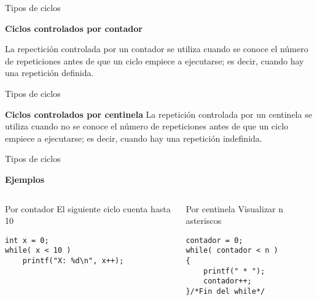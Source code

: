 \begin{frame}{Tipos de ciclos}
\begin{center}
    \textbf{Ciclos controlados por contador}
\end{center}
\justify
\hspace{5mm}
La repectición controlada por un contador se utiliza cuando se conoce el número de repeticiones antes de que un ciclo empiece a ejecutarse; es decir, cuando hay una repetición definida.
\end{frame}

\begin{frame}{Tipos de ciclos}
\begin{center}
    \textbf{Ciclos controlados por centinela}
    \justify
    \hspace{5mm}
    La repetición controlada por un centinela se utiliza cuando no se conoce el número de repeticiones antes de que un ciclo empiece a ejecutarse; es decir, cuando hay una repetición indefinida.
\end{center}
\end{frame}


\begin{frame}[fragile,t]{Tipos de ciclos}
    \begin{center}\textbf{Ejemplos}\end{center}
    \begin{columns}[t]
        \begin{column}{0.57 \textwidth}
            \begin{block}{Por contador}
                El siguiente ciclo cuenta hasta 10
                \begin{lstlisting}
int x = 0;
while( x < 10 )
    printf("X: %d\n", x++);
\end{lstlisting}
            \end{block}
        \end{column}
        \begin{column}{0.5 \textwidth}
            \begin{block}{Por centinela}
                Visualizar n asteriscos
                \begin{lstlisting}
contador = 0;
while( contador < n )
{
    printf(" * ");
    contador++;
}/*Fin del while*/
\end{lstlisting}
            \end{block}
        \end{column}
    \end{columns}
\end{frame}

